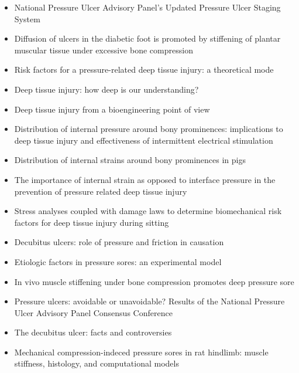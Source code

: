 \begin{itemize}
				\item National Pressure Ulcer Advisory Panel's Updated Pressure Ulcer Staging System \cite{black07}
				\item Diffusion of ulcers in the diabetic foot is promoted by stiffening of plantar muscular tissue under excessive bone compression \cite{gefen04}
				\item Risk factors for a pressure-related deep tissue injury: a theoretical mode \cite{gefen07}
				\item Deep tissue injury: how deep is our understanding? \cite{stekelenburg08}
				\item Deep tissue injury from a bioengineering point of view \cite{gefen09}
				\item Distribution of internal pressure around bony prominences: implications to deep tissue injury and effectiveness of intermittent electrical stimulation \cite{solis12-02}
				\item Distribution of internal strains around bony prominences in pigs \cite{solis12-03}
				\item The importance of internal strain as opposed to interface pressure in the prevention of pressure related deep tissue injury \cite{oomens10}
				\item Stress analyses coupled with damage laws to determine biomechanical risk factors for deep tissue injury during sitting \cite{linderganz09}
				\item Decubitus ulcers: role of pressure and friction in causation \cite{dinsdale74}
				\item Etiologic factors in pressure sores: an experimental model \cite{daniel81}
				\item In vivo muscle stiffening under bone compression promotes deep pressure sore \cite{gefen05}
				\item Pressure ulcers: avoidable or unavoidable? Results of the National Pressure Ulcer Advisory Panel Consensus Conference \cite{black11}
				\item The decubitus ulcer: facts and controversies \cite{campbell10}
				\item Mechanical compression-indeced pressure sores in rat hindlimb: muscle stiffness, histology, and computational models \cite{linderganz04}
			\end{itemize}


